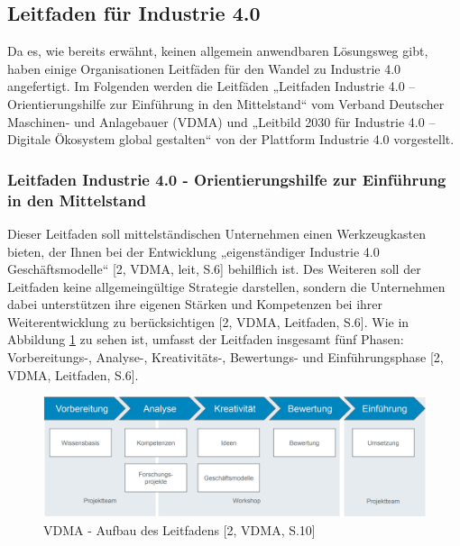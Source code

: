 \subsection{Leitfaden für Industrie 4.0}\label{sec:LeitfadenUmsetung}
Da es, wie bereits erwähnt, keinen allgemein anwendbaren Lösungsweg gibt, haben einige Organisationen Leitfäden für den Wandel zu Industrie 4.0 angefertigt. Im Folgenden werden die Leitfäden „Leitfaden Industrie 4.0 – Orientierungshilfe zur Einführung in den Mittelstand“ vom Verband Deutscher Maschinen- und Anlagebauer (VDMA) und „Leitbild 2030 für Industrie 4.0 – Digitale Ökosystem global gestalten“ von der Plattform Industrie 4.0 vorgestellt.

\subsubsection{Leitfaden Industrie 4.0 - Orientierungshilfe zur Einführung in den Mittelstand}\label{sec:VDMALeitfaden}
Dieser Leitfaden soll mittelständischen Unternehmen einen Werkzeugkasten bieten, der Ihnen bei der Entwicklung „eigenständiger Industrie 4.0 Geschäftsmodelle“ [2, VDMA, leit, S.6] behilflich ist. Des Weiteren soll der Leitfaden keine allgemeingültige Strategie darstellen, sondern die Unternehmen dabei unterstützen ihre eigenen Stärken und Kompetenzen bei ihrer Weiterentwicklung zu berücksichtigen [2, VDMA, Leitfaden, S.6]. Wie in Abbildung \ref{fig:VDMAAufbauLeitfaden} zu sehen ist, umfasst der Leitfaden insgesamt fünf Phasen: Vorbereitungs-, Analyse-, Kreativitäts-, Bewertungs- und Einführungsphase [2, VDMA, Leitfaden, S.6].
\begin{figure}[h]
	\centering
	\includegraphics[width=1\linewidth]{Bilder/A5_VDMA_Phasen}
	\caption{VDMA - Aufbau des Leitfadens [2, VDMA, S.10]}
	\label{fig:VDMAAufbauLeitfaden}
\end{figure}
